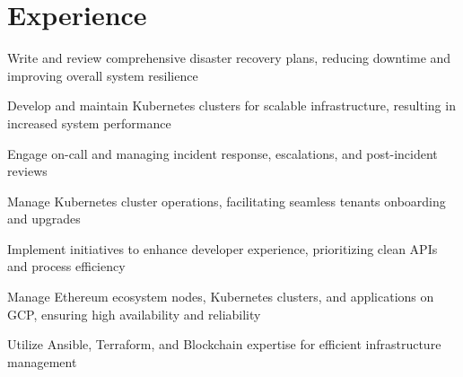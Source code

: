 \documentclass[]{willianpaixao-resume}
\begin{document}
\begin{minipage}[t]{0.64\textwidth}

\section{Experience}
\sectionsep
\begin{tightemize}
\item Write and review comprehensive disaster recovery plans, reducing downtime and improving overall system resilience
\item Develop and maintain Kubernetes clusters for scalable infrastructure, resulting in increased system performance
\end{tightemize}
\sectionsep

\begin{tightemize}
\item Engage on-call and managing incident response, escalations, and post-incident reviews
\item Manage Kubernetes cluster operations, facilitating seamless tenants onboarding and upgrades
\item Implement initiatives to enhance developer experience, prioritizing clean APIs and process efficiency
\end{tightemize}
\sectionsep

\begin{tightemize}
\item Manage Ethereum ecosystem nodes, Kubernetes clusters, and applications on GCP, ensuring high availability and reliability
\item Utilize Ansible, Terraform, and Blockchain expertise for efficient infrastructure management
\end{tightemize}
\sectionsep


\end{minipage}
\end{document}
